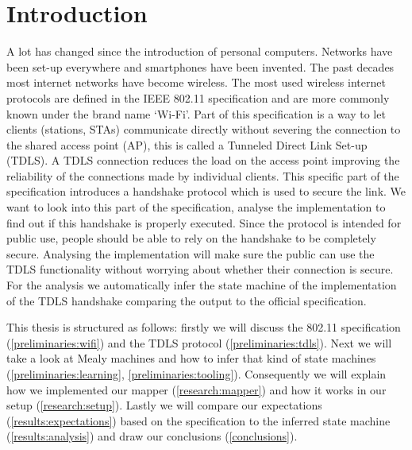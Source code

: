 \chapter{Introduction}\label{introduction}

\iffalse
The introduction of your bachelor thesis introduces the research area, the
research hypothesis, and the scientific contributions of your work.
A good narrative structure is the one suggested by Simon Peyton Jones
\cite{80211}:
%
\begin{itemize}
\item describe the problem / research question
\item motivate why this problem must be solved
\item demonstrate that a (new) solution is needed
\item explain the intuition behind your solution
\item motivate why / how your solution solves the problem (this is technical)
\item explain how it compares with related work
\end{itemize}
\fi


A lot has changed since the introduction of personal computers. Networks have been set-up everywhere and smartphones have been invented. The past decades most internet networks have become wireless. The most used wireless internet protocols are defined in the IEEE 802.11 specification \cite{80211} and are more commonly known under the brand name ‘Wi-Fi’. Part of this specification is a way to let clients (stations, STAs) communicate directly without severing the connection to the shared access point (AP), this is called a Tunneled Direct Link Set-up (TDLS). A TDLS connection reduces the load on the access point improving the reliability of the connections made by individual clients. This specific part of the specification introduces a handshake protocol which is used to secure the link. We want to look into this part of the specification, analyse the implementation to find out if this handshake is properly executed. Since the protocol is intended for public use, people should be able to rely on the handshake to be completely secure. Analysing the implementation will make sure the public can use the TDLS functionality without worrying about whether their connection is secure. For the analysis we automatically infer the state machine of the implementation of the TDLS handshake comparing the output to the official specification.

This thesis is structured as follows: firstly we will discuss the 802.11 specification (\ref{preliminaries:wifi}) and the TDLS protocol (\ref{preliminaries:tdls}). Next we will take a look at Mealy machines and how to infer that kind of state machines (\ref{preliminaries:learning}, \ref{preliminaries:tooling}). Consequently we will explain how we implemented our mapper (\ref{research:mapper}) and how it works in our setup (\ref{research:setup}). Lastly we will compare our expectations (\ref{results:expectations}) based on the specification to the inferred state machine (\ref{results:analysis}) and draw our conclusions (\ref{conclusions}).